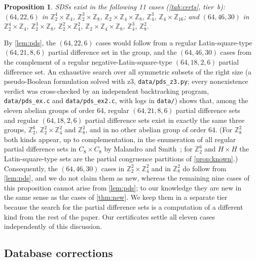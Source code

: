 \documentclass[11pt]{article}
\numberwithin{equation}{section}
\newtheorem{proposition}[theorem]{Proposition}
\theoremstyle{definition}
\theoremstyle{remark}
\newcommand{\Z}{\mathbb Z}
\begin{document}
\begin{proposition}\label{prop:maybe}
SDSs exist in the following 11 cases (\cref{tab:certs}, tier~b):
$(64,22,6)$ in $\Z_2^4\times\Z_4$, $\Z_2^3\times\Z_8$, $\Z_2\times\Z_4\times\Z_8$, $\Z_4^3$,
$\Z_4\times\Z_{16}$; and $(64,46,30)$ in $\Z_2^4\times\Z_4$, $\Z_2^3\times\Z_8$,
$\Z_2^2\times\Z_4^2$, $\Z_2\times\Z_4\times\Z_8$, $\Z_4^3$, $\Z_8^2$.
\end{proposition}
By \cref{lem:pds}, the $(64,22,6)$ cases would follow from a regular Latin-square-type
$(64,21,8,6)$ partial difference set in the group, and the $(64,46,30)$ cases from the complement
of a regular negative-Latin-square-type $(64,18,2,6)$ partial difference set. An exhaustive search
over all symmetric subsets of the right size (a pseudo-Boolean formulation solved with z3,
\texttt{data/pds\_z3.py}; every nonexistence verdict was cross-checked by an independent
backtracking program, \texttt{data/pds\_ex.c} and \texttt{data/pds\_ex2.c}, with logs in
\texttt{data/}) shows that, among the eleven abelian groups
of order 64, regular $(64,21,8,6)$ partial difference sets and regular $(64,18,2,6)$ partial
difference sets exist in exactly the same three groups, $\Z_2^6$, $\Z_2^2\times\Z_4^2$ and
$\Z_8^2$, and in no other abelian group of order 64. (For $\Z_8^2$ both kinds appear, up to complementation, in the
enumeration of all regular partial difference sets in $C_8\times C_8$ by Malandro and
Smith~\cite[Table~5]{MalandroSmith2020}; for $\Z_2^6$ and $H\times H$ the Latin-square-type sets
are the partial congruence partitions of \cref{prop:known}.)
Consequently, the $(64,46,30)$ cases in $\Z_2^2\times\Z_4^2$ and in $\Z_8^2$ do follow from
\cref{lem:pds}, and we do not claim them as new, whereas the remaining nine cases of this
proposition cannot arise from \cref{lem:pds}; to our knowledge they are new in the same sense as
the cases of \cref{thm:new}. We keep them in a separate tier because the search for the partial
difference sets is a computation of a different kind from the rest of the paper. Our certificates
settle all eleven cases independently of this discussion.

\subsection{Database corrections}
\end{document}
